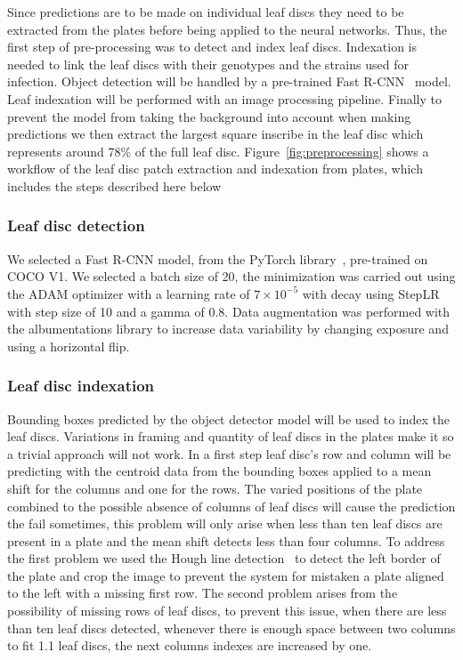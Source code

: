 \documentclass[english]{article}
\begin{document}
Since predictions are to be made on individual leaf discs they need to be extracted from the plates before being applied to the neural networks. Thus, the first step of pre-processing was to detect and index leaf discs. Indexation is needed to link the leaf discs with their genotypes and the strains used for infection.
Object detection will be handled by a pre-trained Fast R-CNN~\parencite{girshickFastRCNN2015} model. Leaf indexation will be performed with an image processing pipeline. Finally to prevent the model from taking the background into account when making predictions we then extract the largest square inscribe in the leaf disc which represents around 78\% of the full leaf disc. Figure~\ref{fig:preprocessing} shows a workflow of the leaf disc patch extraction and indexation from plates, which includes the steps described here below

\subsubsection{Leaf disc detection}
We selected a Fast R-CNN model, from the PyTorch library~\parencite{falcon2019pytorch}, pre-trained on COCO V1. We selected a batch size of 20, the minimization was carried out using the ADAM optimizer with a learning rate of $7\times 10^{-5}$ with decay using StepLR with step size of 10 and a gamma of 0.8. Data augmentation was performed with the albumentations library to increase data variability by changing exposure and using a horizontal flip.

\subsubsection{Leaf disc indexation}
Bounding boxes predicted by the object detector model will be used to index the leaf discs. Variations in framing and quantity of leaf discs in the plates make it so a trivial approach will not work.
In a first step leaf disc's row and column will be predicting with the centroid data from the bounding boxes applied to a mean shift for the columns and one for the rows. The varied positions of the plate combined to the possible absence of columns of leaf discs will cause the prediction the fail sometimes, this problem will only arise when less than ten leaf discs are present in a plate and the mean shift detects less than four columns. To address the first problem we used the Hough line detection~\parencite{dudaUseHoughTransformation1972} to detect the left border of the plate and crop the image to prevent the system for mistaken a plate aligned to the left with a missing first row. The second problem arises from the possibility of missing rows of leaf discs, to prevent this issue, when there are less than ten leaf discs detected, whenever there is enough space between two columns to fit 1.1 leaf discs, the next columns indexes are increased by one.
\end{document}
